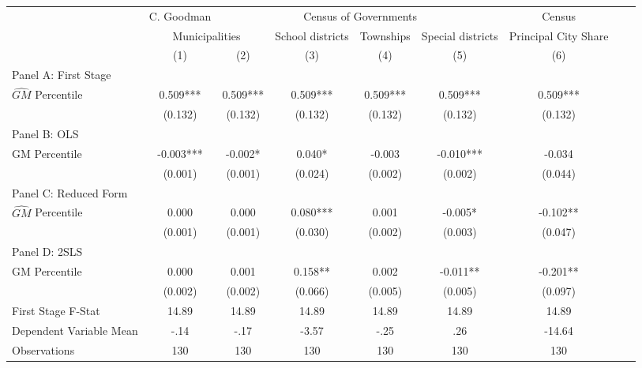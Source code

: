  \begin{tabular}{l*{8}{c}} \toprule
&\multicolumn{1}{c}{C. Goodman}&\multicolumn{4}{c}{Census of Governments}&\multicolumn{1}{c}{Census}\\\cmidrule(lr){2-2}\cmidrule(lr){3-6}\cmidrule(lr){7-7}
&\multicolumn{2}{c}{Municipalities}&\multicolumn{1}{c}{School districts}&\multicolumn{1}{c}{Townships}&\multicolumn{1}{c}{Special districts}&\multicolumn{1}{c}{Principal City Share}\\\cmidrule(lr){2-3}\cmidrule(lr){4-6}\cmidrule(lr){7-7}
&\multicolumn{1}{c}{(1)}&\multicolumn{1}{c}{(2)}&\multicolumn{1}{c}{(3)}&\multicolumn{1}{c}{(4)}&\multicolumn{1}{c}{(5)}&\multicolumn{1}{c}{(6)}\\
\cmidrule(lr){1-7}
\multicolumn{6}{l}{Panel A: First Stage}\\
\cmidrule(lr){1-7}
$\widehat{GM}$ Percentile&    0.509***&    0.509***&    0.509***&    0.509***&    0.509***&    0.509***\\
                &  (0.132)   &  (0.132)   &  (0.132)   &  (0.132)   &  (0.132)   &  (0.132)   \\
\cmidrule(lr){1-7}
\multicolumn{6}{l}{Panel B: OLS}\\
\cmidrule(lr){1-7}
GM Percentile   &   -0.003***&   -0.002*  &    0.040*  &   -0.003   &   -0.010***&   -0.034   \\
                &  (0.001)   &  (0.001)   &  (0.024)   &  (0.002)   &  (0.002)   &  (0.044)   \\
\cmidrule(lr){1-7}
\multicolumn{6}{l}{Panel C: Reduced Form}\\
\cmidrule(lr){1-7}
$\widehat{GM}$ Percentile&    0.000   &    0.000   &    0.080***&    0.001   &   -0.005*  &   -0.102** \\
                &  (0.001)   &  (0.001)   &  (0.030)   &  (0.002)   &  (0.003)   &  (0.047)   \\
\cmidrule(lr){1-7}
\multicolumn{6}{l}{Panel D: 2SLS}\\
\cmidrule(lr){1-7}
GM Percentile   &    0.000   &    0.001   &    0.158** &    0.002   &   -0.011** &   -0.201** \\
                &  (0.002)   &  (0.002)   &  (0.066)   &  (0.005)   &  (0.005)   &  (0.097)   \\
\midrule
First Stage F-Stat&    14.89   &    14.89   &    14.89   &    14.89   &    14.89   &    14.89   \\
Dependent Variable Mean&     -.14   &     -.17   &    -3.57   &     -.25   &      .26   &   -14.64   \\
Observations    &      130   &      130   &      130   &      130   &      130   &      130   \\
       \bottomrule \end{tabular}
